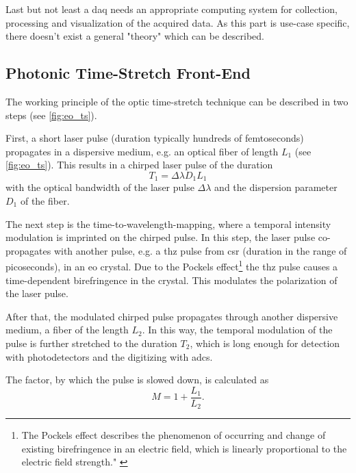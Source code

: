 Last but not least a \gls{daq} needs an appropriate computing system for collection, processing and visualization of the acquired data. As this part is use-case specific, there doesn't exist a general "theory" which can be described.

\subsection{Photonic Time-Stretch Front-End}
The working principle of the optic time-stretch technique can be described in two steps (see \autoref{fig:eo_ts}).

First, a short laser pulse (duration typically hundreds of femtoseconds) propagates in a dispersive medium, e.g. an optical fiber of length $L_1$ (see \autoref{fig:eo_ts}).
This results in a chirped laser pulse of the duration
\begin{equation}
	T_1 = \Delta \lambda D_1 L_1
\end{equation}
with the optical bandwidth of the laser pulse $\Delta \lambda$  and the dispersion parameter $D_1$ of the fiber.

The next step is the time-to-wavelength-mapping, where a temporal intensity modulation is imprinted on the chirped pulse.
In this step, the laser pulse co-propagates with another pulse, e.g. a \gls{thz} pulse from \gls{csr} (duration in the range of picoseconds), in an \gls{eo} crystal. Due to the Pockels effect\footnote{The Pockels effect describes the phenomenon of occurring and change of existing birefringence in an electric field, which is linearly proportional to the electric field strength." \cite{pockels}} the \gls{thz} pulse causes a time-dependent birefringence in the crystal.
This modulates the polarization of the laser pulse.

After that, the modulated chirped pulse propagates through another dispersive medium, a fiber of the length $L_2$.
In this way, the temporal modulation of the pulse is further stretched to the duration $T_2$, which is long enough for detection with photodetectors and the digitizing with \Glspl{adc}. \cite{roussel2014}

The factor, by which the pulse is slowed down, is calculated as
\begin{equation}
	M = 1 + \frac{L_1}{L_2}.
\end{equation}

